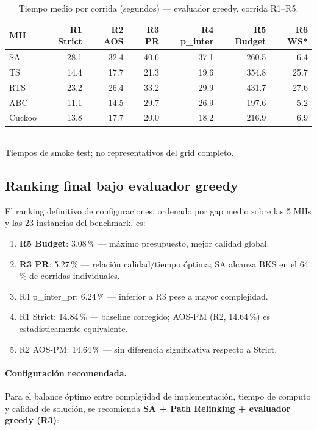 \documentclass[11pt,a4paper]{article}
\theoremstyle{definition}
\theoremstyle{remark}
\begin{document}
\begin{table}[h]
\centering
\caption{Tiempo medio por corrida (segundos) — evaluador greedy, corrida R1--R5.}
\label{tab:tiempo-medio}
\small
\begin{tabular}{lrrrrrr}
\toprule
MH & R1 Strict & R2 AOS & R3 PR & R4 p\_inter & R5 Budget & R6 WS* \\
\midrule
SA      &  28.1 &  32.4 &  40.6 &  37.1 & 260.5 &   6.4 \\
TS      &  14.4 &  17.7 &  21.3 &  19.6 & 354.8 &  25.7 \\
RTS     &  23.2 &  26.4 &  33.2 &  29.9 & 431.7 &  27.6 \\
ABC     &  11.1 &  14.5 &  29.7 &  26.9 & 197.6 &   5.2 \\
Cuckoo  &  13.8 &  17.7 &  20.0 &  18.2 & 216.9 &   6.9 \\
\bottomrule
\end{tabular}
\\[4pt]
\footnotesize *Tiempos de smoke test; no representativos del grid completo.
\end{table}

\subsection{Ranking final bajo evaluador greedy}

El ranking definitivo de configuraciones, ordenado por gap medio
sobre las 5 MHs y las 23 instancias del benchmark, es:

\begin{enumerate}
\item \textbf{R5 Budget}: 3.08\,\% — máximo presupuesto, mejor calidad global.
\item \textbf{R3 PR}: 5.27\,\% — relación calidad/tiempo óptima;
      SA alcanza BKS en el 64\,\% de corridas individuales.
\item R4 p\_inter\_pr: 6.24\,\% — inferior a R3 pese a mayor complejidad.
\item R1 Strict: 14.84\,\% — baseline corregido; AOS-PM (R2, 14.64\,\%)
      es estadisticamente equivalente.
\item R2 AOS-PM: 14.64\,\% — sin diferencia significativa respecto a Strict.
\end{enumerate}

\paragraph{Configuración recomendada.}
Para el balance óptimo entre complejidad de implementación, tiempo de
computo y calidad de solución, se recomienda \textbf{SA + Path Relinking
+ evaluador greedy (R3)}:
\end{document}
